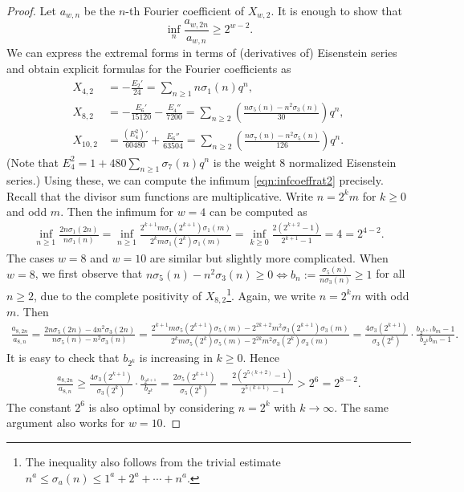 \documentclass[10pt,reqno]{amsproc}
\newcommand{\1}{\mathds{1}}	%
\theoremstyle{definition}
\theoremstyle{remark}
\begin{document}
\begin{proof}
Let $a_{w, n}$ be the $n$-th Fourier coefficient of $X_{w, 2}$.
It is enough to show that
\begin{equation}
\label{eqn:infcoeffrat2}
    \inf_{n} \frac{a_{w, 2n}}{a_{w, n}} \geq 2^{w-2}.
\end{equation}
We can express the extremal forms in terms of (derivatives of) Eisenstein series and obtain explicit formulas for the Fourier coefficients as
\begin{align}
    X_{4, 2} &= -\frac{E_2'}{24} = \sum_{n \geq 1} n\sigma_1(n) q^n, \\
    X_{8, 2} &= -\frac{E_6'}{15120} - \frac{E_4''}{7200} = \sum_{n \geq 2} \left(\frac{n \sigma_5(n) - n^2 \sigma_3(n)}{30}\right) q^n, \\
    X_{10, 2} &= \frac{(E_4^2)'}{60480} + \frac{E_6''}{63504}  = \sum_{n \geq 2} \left(\frac{n \sigma_7(n) - n^2 \sigma_5(n)}{126}\right) q^n.
\end{align}
(Note that $E_4^2 = 1 + 480 \sum_{n \geq 1} \sigma_7(n)q^n$ is the weight $8$ normalized Eisenstein series.)
Using these, we can compute the infimum \eqref{eqn:infcoeffrat2} precisely.
Recall that the divisor sum functions are multiplicative.
Write $n = 2^k m$ for $k\geq 0$ and odd $m$.
Then the infimum for $w = 4$ can be computed as
\begin{align*}
    \inf_{n\geq 1} \frac{2n\sigma_1(2n)}{n \sigma_1(n)} = \inf_{n \geq 1} \frac{2^{k+1}m \sigma_1(2^{k+1})\sigma_1(m)}{2^k m \sigma_1(2^k)\sigma_1(m)} = \inf_{k \geq 0} \frac{2(2^{k+2} - 1)}{2^{k+1} - 1} = 4 = 2^{4-2}.
\end{align*}
The cases $w = 8$ and $w = 10$ are similar but slightly more complicated.
When $w = 8$, we first observe that $n \sigma_5(n) - n^2 \sigma_3(n) \geq 0 \Leftrightarrow b_{n} := \frac{\sigma_5(n)}{n \sigma_3(n)} \geq 1$ for all $n \geq 2$, due to the complete positivity of $X_{8, 2}$\footnote{The inequality also follows from the trivial estimate $n^a \leq \sigma_a(n) \leq 1^a + 2^a + \cdots + n^a$.}. 
Again, we write $n = 2^k m$ with odd $m$. Then
\begin{align*}
    \frac{a_{8, 2n}}{a_{8, n}} = \frac{2n \sigma_5(2n) - 4n^2 \sigma_3(2n)}{n \sigma_5(n) - n^2 \sigma_3(n)} 
    = \frac{2^{k+1}m \sigma_5(2^{k+1})\sigma_5(m) - 2^{2k+2}m^2 \sigma_3(2^{k+1})\sigma_3(m)}{2^k m \sigma_5(2^k)\sigma_5(m) - 2^{2k}m^2 \sigma_3(2^k)\sigma_3(m)} 
    = \frac{4\sigma_3(2^{k+1})}{\sigma_3(2^k)} \cdot \frac{b_{2^{k+1}} b_{m} - 1}{b_{2^k} b_{m} - 1}.
\end{align*}
It is easy to check that $b_{2^k}$ is increasing in $k \geq 0$.
Hence
\begin{align*}
    \frac{a_{8, 2n}}{a_{8, n}} \geq \frac{4 \sigma_3(2^{k+1})}{\sigma_3(2^k)} \cdot \frac{b_{2^{k+1}}}{b_{2^k}} = \frac{2 \sigma_5(2^{k+1})}{\sigma_5(2^k)} = \frac{2(2^{5(k+2)} - 1)}{2^{5(k+1)} - 1} > 2^{6} = 2^{8-2}.
\end{align*}
The constant $2^6$ is also optimal by considering $n = 2^k$ with $k \to \infty$.
The same argument also works for $w = 10$.


\end{proof}
\end{document}
